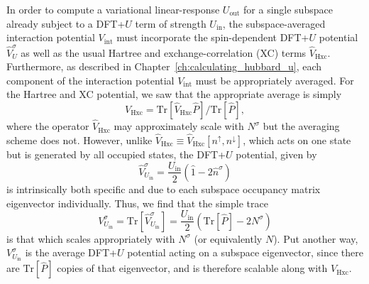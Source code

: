 In order to compute a variational linear-response 
$U_\textrm{out}$ 
for a single subspace already subject to a DFT+$U$
term of strength $U_\textrm{in}$, 
the subspace-averaged interaction potential 
$V_\textrm{int}$
must incorporate the {spin-dependent} DFT+$U$ potential 
{$\hat{V}^\sigma_U$ 
as well as the usual Hartree and exchange-correlation (XC) terms 
$\hat{V}_\textrm{Hxc}$.}
%
Furthermore, 
as described in Chapter~\ref{ch:calculating_hubbard_u}, 
each component of the interaction potential 
$ V_\textrm{int}$ 
must be appropriately averaged.
%
For the Hartree and XC potential,  
we saw that the appropriate average is simply
%
\begin{equation}
V_\textrm{Hxc}=\textrm{Tr}[\hat V_\textrm{Hxc}\hat P]/\textrm{Tr}[\hat P],
\end{equation}
%
where the operator $\hat{V}_\textrm{Hxc}$ 
may approximately scale with $N^\sigma$ 
but the averaging scheme does not.
% 
However, unlike 
$\hat{V}_\textrm{Hxc}\equiv\hat{V}_\textrm{Hxc}[n^\uparrow,n^{\downarrow}]$, 
which acts on one state but is 
generated by all occupied states, 
the  DFT+$U$ potential, given by 
%
\begin{equation}
\hat{V}_{U_\textrm{in}}^\sigma 
= \frac{U_\textrm{in}}{2}(\hat{1}-2\hat{n}^\sigma)
\end{equation}
%
is intrinsically both specific and due to 
each subspace occupancy matrix eigenvector individually.
%
Thus, we find that the simple trace 
\begin{equation}
V_{U_\textrm{in}}^\sigma = \textrm{Tr} [ \hat{V}_{U_\textrm{in}}^\sigma ] 
= \frac{U_\textrm{in}}{2} ( \mathrm{Tr} [ \hat{P} ] - 2 N^\sigma )
\end{equation}
is that which scales appropriately with $N^\sigma$ 
(or equivalently $N$).
% 
Put another way, $V_{U_\textrm{in}}^\sigma $ is the average
DFT+$U$ potential acting on a  subspace eigenvector, 
since there are $\textrm{Tr} [\hat{P}] $ copies of that eigenvector, 
and is therefore scalable along with $V_\textrm{Hxc}$.
%

